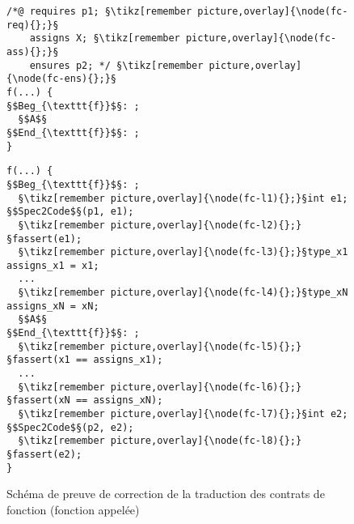 \begin{figure}[bt]
  \begin{minipage}{0.65\textwidth}
    \begin{lstlisting}[escapechar=§]
/*@ requires p1; §\tikz[remember picture,overlay]{\node(fc-req){};}§
    assigns X; §\tikz[remember picture,overlay]{\node(fc-ass){};}§
    ensures p2; */ §\tikz[remember picture,overlay]{\node(fc-ens){};}§
f(...) {
§$Beg_{\texttt{f}}$§: ;
  §$A$§
§$End_{\texttt{f}}$§: ;
}
    \end{lstlisting}
  \end{minipage}\hfill
  \begin{minipage}{0.49\textwidth}
    \begin{lstlisting}[escapechar=§]
f(...) {
§$Beg_{\texttt{f}}$§: ;
  §\tikz[remember picture,overlay]{\node(fc-l1){};}§int e1; §$Spec2Code$§(p1, e1);
  §\tikz[remember picture,overlay]{\node(fc-l2){};}§fassert(e1);
  §\tikz[remember picture,overlay]{\node(fc-l3){};}§type_x1 assigns_x1 = x1;
  ...
  §\tikz[remember picture,overlay]{\node(fc-l4){};}§type_xN assigns_xN = xN;
  §$A$§
§$End_{\texttt{f}}$§: ;
  §\tikz[remember picture,overlay]{\node(fc-l5){};}§fassert(x1 == assigns_x1);
  ...
  §\tikz[remember picture,overlay]{\node(fc-l6){};}§fassert(xN == assigns_xN);
  §\tikz[remember picture,overlay]{\node(fc-l7){};}§int e2; §$Spec2Code$§(p2, e2);
  §\tikz[remember picture,overlay]{\node(fc-l8){};}§fassert(e2);
}
    \end{lstlisting}
  \end{minipage}
  \caption{Schéma de preuve de correction de la traduction des contrats de
    fonction (fonction appelée)}
  \label{fig:proof-fct-contract-call}
\end{figure}
